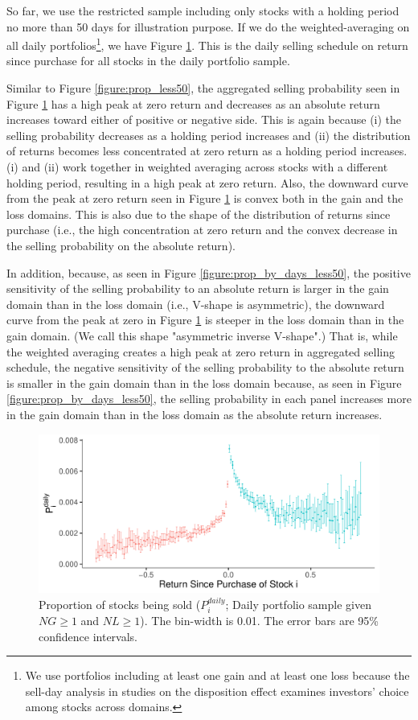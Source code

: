 \documentclass[11pt, a4paper]{article}
\begin{document}
So far, we use the restricted sample including only stocks with a holding period no more than 50 days for illustration purpose.
If we do the weighted-averaging on all daily portfolios\footnote{We use portfolios including at least one gain and at least one loss because the sell-day analysis in studies on the disposition effect examines investors' choice among stocks across domains.}, we have Figure \ref{figure:prop_NG1NL1}. This is the daily selling schedule on return since purchase for all stocks in the daily portfolio sample. 

Similar to Figure \ref{figure:prop_less50}, the aggregated selling probability seen in Figure \ref{figure:prop_NG1NL1} has a high peak at zero return and decreases as an absolute return increases toward either of positive or negative side. This is again because (i) the selling probability decreases as a holding period increases and (ii) the distribution of returns becomes less concentrated at zero return as a holding period increases. (i) and (ii) work together in weighted averaging across stocks with a different holding period, resulting in a high peak at zero return. Also, the downward curve from the peak at zero return seen in Figure \ref{figure:prop_NG1NL1} is convex both in the gain and the loss domains. This is also due to the shape of the distribution of returns since purchase (i.e., the high concentration at zero return and the convex decrease in the selling probability on the absolute return).

In addition, because, as seen  in Figure \ref{figure:prop_by_days_less50}, the positive sensitivity of the selling probability to an absolute return is larger in the gain domain than in the loss domain (i.e.,  V-shape is asymmetric), the downward curve from the peak at zero in Figure \ref{figure:prop_NG1NL1} is steeper in the loss domain than in the gain domain. (We call this shape "asymmetric inverse V-shape".) That is, while the weighted averaging creates a high peak at zero return in aggregated selling schedule, the negative sensitivity of the selling probability to the absolute return is smaller in the gain domain than in the loss domain because, as seen  in Figure \ref{figure:prop_by_days_less50}, the selling probability in each panel increases more in the gain domain than in the loss domain as the absolute return increases.

\begin{figure}[H]
	\centering
	\includegraphics[width=0.8\columnwidth]{barc_schedule_daily_NG1_NL1_3.pdf}
	\caption{Proportion of stocks being sold ($P^{daily}_{i}$; Daily portfolio sample given $NG\geq1$ and $NL\geq1$). The bin-width is 0.01. The error bars are 95\% confidence intervals.}
	\label{figure:prop_NG1NL1}
\end{figure}
\end{document}
